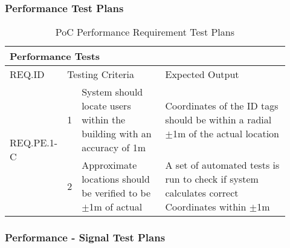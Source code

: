 \subsubsection{Performance Test Plans}
\begin{table}[h!]
    \centering
    
    \begin{tabular}{|m{0.15\linewidth}|m{0.02\linewidth}|m{0.3\linewidth}|m{0.45\linewidth}|} 
    \hline
    \multicolumn{4}{|l|}{Performance Tests    }      \\ 
    \hline
    REQ.ID      & \multicolumn{2}{l|}{Testing Criteria}      & Expected Output          \\ 
    \hline
    \multirow{2}{*}{REQ.PE.1-C} & 1 
    & System should locate users within the building with an accuracy of 1m
    & Coordinates of the ID tags should be within a radial $\pm$1m of the actual location    \\ 
    \cline{2-4}
    & 2 
    & Approximate locations should be verified to be $\pm$1m of actual 
    & A set of automated tests is run to check if system calculates correct Coordinates 
    within $\pm$1m  \\
    \hline 
\end{tabular}
\caption{PoC Performance Requirement Test Plans}
\end{table}

\break
\subsubsection{Performance - Signal Test Plans}

